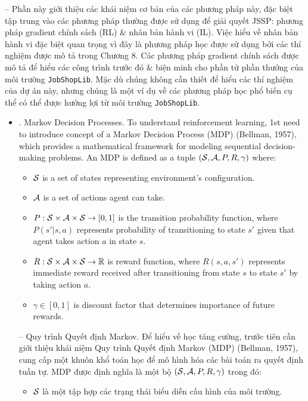 \documentclass{article}
\begin{document}
\begin{itemize}
    -- Phần này giới thiệu các khái niệm cơ bản của các phương pháp này, đặc biệt tập trung vào các phương pháp thường được sử dụng để giải quyết JSSP: phương pháp gradient chính sách (RL) \& nhân bản hành vi (IL). Việc hiểu về nhân bản hành vi đặc biệt quan trọng vì đây là phương pháp học được sử dụng bởi các thí nghiệm được mô tả trong Chương 8. Các phương pháp gradient chính sách được mô tả để hiểu các công trình trước đó \& biện minh cho phần tử phần thưởng của môi trường {\tt JobShopLib}. Mặc dù chúng không cần thiết để hiểu các thí nghiệm của dự án này, nhưng chúng là một ví dụ về các phương pháp học phổ biến cụ thể có thể được hưởng lợi từ môi trường {\tt JobShopLib}.
    \begin{itemize}
        \item {. Markov Decision Processes.} To understand reinforcement learning, 1st need to introduce concept of a Markov Decision Process (MDP) (Bellman, 1957), which provides a mathematical framework for modeling sequential decision-making problems. An MDP is defined as a tuple $({\cal S},{\cal A},P,R,\gamma)$ where:
        \begin{itemize}
            \item ${\cal S}$ is a set of states representing environment's configuration.
            \item ${\cal A}$ is a set of actions agent can take.
            \item $P:{\cal S}\times{\cal A}\times{\cal S}\to[0,1]$ is the transition probability function, where $P(s'|s,a)$ represents probability of transitioning to state $s'$ given that agent takes action $a$ in state $s$.
            \item $R:{\cal S}\times{\cal A}\times{\cal S}\to\mathbb{R}$ is reward function, where $R(s,a,s')$ represents immediate reward received after transitioning from state $s$ to state $s'$ by taking action $a$.
            \item $\gamma\in[0,1]$ is discount factor that determines importance of future rewards.
        \end{itemize}
        -- {\sf Quy trình Quyết định Markov.} Để hiểu về học tăng cường, trước tiên cần giới thiệu khái niệm Quy trình Quyết định Markov (MDP) (Bellman, 1957), cung cấp một khuôn khổ toán học để mô hình hóa các bài toán ra quyết định tuần tự. MDP được định nghĩa là một bộ $({\cal S},{\cal A},P,R,\gamma)$ trong đó:
        \begin{itemize}
            \item ${\cal S}$ là một tập hợp các trạng thái biểu diễn cấu hình của môi trường.

\end{itemize}
\end{itemize}
\end{itemize}
\end{document}
